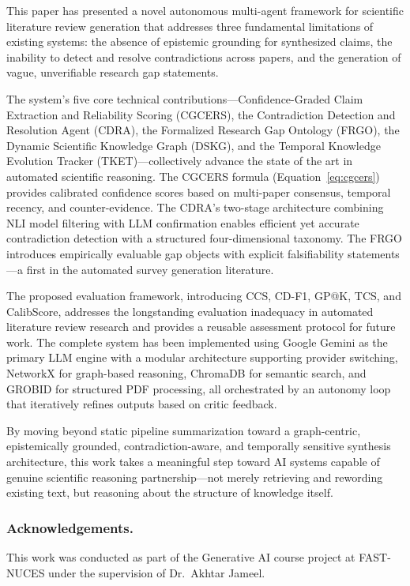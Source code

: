 This paper has presented a novel autonomous multi-agent framework for scientific literature review generation that addresses three fundamental limitations of existing systems: the absence of epistemic grounding for synthesized claims, the inability to detect and resolve contradictions across papers, and the generation of vague, unverifiable research gap statements.

The system's five core technical contributions---Confidence-Graded Claim Extraction and Reliability Scoring (CGCERS), the Contradiction Detection and Resolution Agent (CDRA), the Formalized Research Gap Ontology (FRGO), the Dynamic Scientific Knowledge Graph (DSKG), and the Temporal Knowledge Evolution Tracker (TKET)---collectively advance the state of the art in automated scientific reasoning. The CGCERS formula (Equation~\ref{eq:cgcers}) provides calibrated confidence scores based on multi-paper consensus, temporal recency, and counter-evidence. The CDRA's two-stage architecture combining NLI model filtering with LLM confirmation enables efficient yet accurate contradiction detection with a structured four-dimensional taxonomy. The FRGO introduces empirically evaluable gap objects with explicit falsifiability statements---a first in the automated survey generation literature.

The proposed evaluation framework, introducing CCS, CD-F1, GP@K, TCS, and CalibScore, addresses the longstanding evaluation inadequacy in automated literature review research and provides a reusable assessment protocol for future work. The complete system has been implemented using Google Gemini as the primary LLM engine with a modular architecture supporting provider switching, NetworkX for graph-based reasoning, ChromaDB for semantic search, and GROBID for structured PDF processing, all orchestrated by an autonomy loop that iteratively refines outputs based on critic feedback.

By moving beyond static pipeline summarization toward a graph-centric, epistemically grounded, contradiction-aware, and temporally sensitive synthesis architecture, this work takes a meaningful step toward AI systems capable of genuine scientific reasoning partnership---not merely retrieving and rewording existing text, but reasoning about the structure of knowledge itself.

\subsubsection{Acknowledgements.} This work was conducted as part of the Generative AI course project at FAST-NUCES under the supervision of Dr.~Akhtar Jameel.

